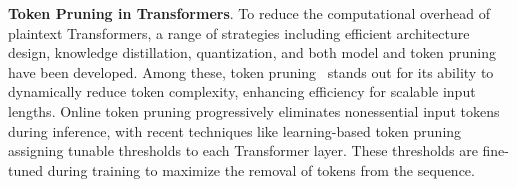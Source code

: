 

\noindent\textbf{Token Pruning in Transformers}. To reduce the computational overhead of plaintext Transformers, a range of strategies including efficient architecture design, knowledge distillation, quantization, and both model and token pruning have been developed. Among these, token pruning~\citep{goyal2020power,kim2020lat,wang2021spatten} stands out for its ability to dynamically reduce token complexity, enhancing efficiency for scalable input lengths. Online token pruning progressively eliminates nonessential input tokens during inference, with recent techniques like learning-based token pruning assigning tunable thresholds to each Transformer layer. These thresholds are fine-tuned during training to maximize the removal of tokens from the sequence. %



